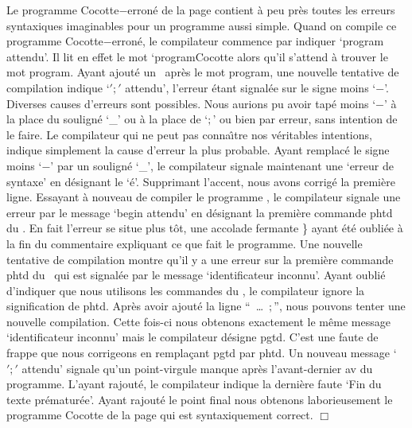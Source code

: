 \begin{exemple}{\rm
\hfill Le pro\-gram\-me {\idt Co\-cot\-te$-$\-er\-ro\-né} de la page 
\pageref{prog:Cocotte-errone}
contient à peu près toutes les erreurs syntaxiques imaginables pour
un programme aussi simple.
Quand on compile ce programme {\idt Cocotte$-$erroné}, le compilateur commence par indiquer
`{\mcl program} attendu'. Il lit en effet le mot `{\mcl program}{\idt Cocotte} alors
qu'il s'attend à trouver le mot {\mcl program}.
Ayant ajouté un \blanc\ après le mot
{\mcl program}, une nouvelle tentative de compilation indique 
`{\idt $\scriptstyle ';\scriptstyle '$} attendu', l'erreur étant 
signalée sur le signe moins `{\idt $-$}'.
Diverses causes d'erreurs sont possibles. Nous aurions pu avoir tapé 
moins `{\idt $-$}' à la place du souligné `{\idt \_}' ou 
à la place de  `{\idt $;$}' ou bien par erreur, sans intention de le faire. Le compilateur
qui ne peut pas conna\^\i tre nos véritables intentions, indique simplement la cause d'erreur
la plus pro\-ba\-ble. Ayant remplacé le signe moins `{\idt $-$}' par un
souligné `{\idt \_}', le compilateur signale maintenant une `erreur de syntaxe'
en désignant le `é'. Supprimant l'accent, nous avons corrigé la 
première ligne. Essayant à nouveau de compiler le programme \pascal,
le compilateur signale une erreur par le message `{\mcl begin} attendu' 
en désignant la première commande {\idt  phtd} du \robot. En fait
l'erreur se situe plus tôt, une accolade fermante {\idt \}}
ayant été oubliée à la fin du commentaire expliquant ce que fait 
le programme. Une nouvelle tentative de compilation montre qu'il y a une 
erreur sur la première commande {\idt  phtd} du \robot\ qui est
signalée par le message `identificateur inconnu'. Ayant oublié d'indiquer
que nous utilisons les commandes du \robotErr, le compilateur ignore la
signification de {\idt  phtd}. Après avoir ajouté la ligne
``{\ \ldots\ $;$}'', nous pouvons tenter une nouvelle compilation.
Cette fois-ci nous obtenons exact\-ement le même message `identificateur 
inconnu' mais le compilateur désigne {\idt  pgtd}. C'est une faute de
frappe que nous corrigeons en remplaçant {\idt  pgtd} par {\idt  phtd}.
Un nouveau message `{\idt ${\scriptstyle '};{\scriptstyle '}$} attendu'
signale qu'un point-virgule manque après l'avant-dernier {\idt  av} 
du programme. L'ayant rajouté, le compilateur indique la dernière
faute `Fin du texte prématurée'. Ayant rajouté le point final nous
obtenons laborieusement le programme {\idt Cocotte} de la page 
\pageref{prog:Cocotte} qui est syntaxiquement correct.
\noindent $\Box$ }\end{exemple}



